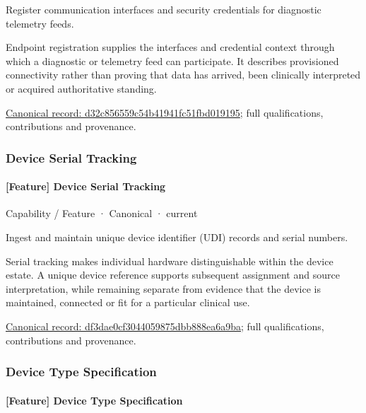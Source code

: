 Register communication interfaces and security credentials for diagnostic telemetry feeds.



Endpoint registration supplies the interfaces and credential context through which a diagnostic or telemetry feed can participate. It describes provisioned connectivity rather than proving that data has arrived, been clinically interpreted or acquired authoritative standing.


{\footnotesize \href{../../../../continuum/strategy/capability/feature/d32c856559c54b41941fc51fbd019195.md}{Canonical record: d32c856559c54b41941fc51fbd019195}; full qualifications, contributions and provenance.}\par
\subsubsection{Device Serial Tracking}

\paragraph{[Feature] Device Serial Tracking}

\label{element:df3dae0cf3044059875dbb888ea6a9ba}
{\small Capability / Feature · Canonical · current}\par

Ingest and maintain unique device identifier (UDI) records and serial numbers.



Serial tracking makes individual hardware distinguishable within the device estate. A unique device reference supports subsequent assignment and source interpretation, while remaining separate from evidence that the device is maintained, connected or fit for a particular clinical use.


{\footnotesize \href{../../../../continuum/strategy/capability/feature/df3dae0cf3044059875dbb888ea6a9ba.md}{Canonical record: df3dae0cf3044059875dbb888ea6a9ba}; full qualifications, contributions and provenance.}\par
\subsubsection{Device Type Specification}

\paragraph{[Feature] Device Type Specification}

